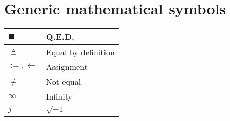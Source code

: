 \section{Generic mathematical symbols}
\begin{xltabular}{\textwidth}{XX}
	\(\blacksquare\)   & Q.E.D.                                            \\ \hline
	\(\triangleq\)     & Equal by definition                               \\ \hline
	\(:=, \leftarrow\) & Assignment \cite{rosenDiscreteMathematicsIts2011} \\ \hline
	\(\neq\)           & Not equal                                         \\ \hline
	\(\infty\)         & Infinity                                          \\ \hline
	\(j\)              & \(\sqrt{-1}\)                                     \\
\end{xltabular}